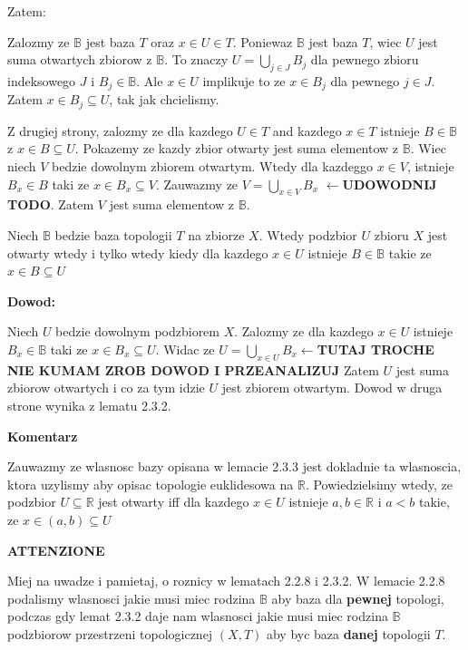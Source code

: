 \documentclass{article}
\begin{document}
Zatem:

Zalozmy ze $\mathbb{B}$ jest baza $T$ oraz $x \in U \in T$. Poniewaz $\mathbb{B}$ jest baza $T$, wiec $U$ jest suma otwartych zbiorow z $\mathbb{B}$. To znaczy $U = \bigcup\limits_{j \in J}B_{j}$ dla pewnego zbioru indeksowego $J$ i $B_{j} \in \mathbb{B}$. Ale $x \in U$ implikuje to ze $x \in B_{j}$ dla pewnego $j \in J$. Zatem $x \in B_{j} \subseteq U$, tak jak chcielismy.

Z drugiej strony, zalozmy ze dla kazdego $U \in T$ and kazdego $x\in T$ istnieje $B \in \mathbb{B}$ z $x \in B \subseteq U$. Pokazemy ze kazdy zbior otwarty jest suma elementow z $\mathbb{B}$. Wiec niech $V$ bedzie dowolnym zbiorem otwartym. Wtedy dla kazdeggo $x \in V$, istnieje $B_{x} \in B$ taki ze $x \in B_{x} \subseteq V$. Zauwazmy ze $V = \bigcup\limits_{x \in V}B_{x}$ $\leftarrow$\textbf{UDOWODNIJ TODO}. Zatem $V$ jest suma elementow z $\mathbb{B}$.

\begin{tcolorbox}[colback=white!90!green,colframe=black!35!green,title=2.3.3 Lemat: Baza topologii podejscie 3?]

    Niech $\mathbb{B}$ bedzie baza topologii $T$ na zbiorze $X$. Wtedy podzbior $U$ zbioru $X$ jest otwarty wtedy i tylko wtedy kiedy dla kazdego $x \in U$ istnieje $B \in \mathbb{B}$ takie ze $x \in B \subseteq U$

\end{tcolorbox}

\textbf{Dowod:}

Niech $U$ bedzie dowolnym podzbiorem $X$. Zalozmy ze dla kazdego $x \in U$ istnieje $B_{x} \in \mathbb{B}$ taki ze $x \in B_{x} \subseteq U$. Widac ze $U = \bigcup\limits_{x \in U}B_{x}\leftarrow$\textbf{TUTAJ TROCHE NIE KUMAM ZROB DOWOD I PRZEANALIZUJ} Zatem $U$ jest suma zbiorow otwartych i co za tym idzie $U$ jest zbiorem otwartym. Dowod w druga strone wynika z lematu 2.3.2.

\textbf{Komentarz}

Zauwazmy ze wlasnosc bazy opisana w lemacie 2.3.3 jest dokladnie ta wlasnoscia, ktora uzylismy aby opisac topologie euklidesowa na $\mathbb{R}$. Powiedzielsimy wtedy, ze podzbior $U \subseteq \mathbb{R}$ jest otwarty iff dla kazdego $x \in U$ istnieje $a,b \in \mathbb{R}$ i $a<b$ takie, ze $x \in (a,b) \subseteq U$

\textbf{ATTENZIONE}

Miej na uwadze i pamietaj, o roznicy w lematach 2.2.8 i 2.3.2. W lemacie 2.2.8 podalismy wlasnosci jakie musi miec rodzina $\mathbb{B}$ aby baza dla \textbf{pewnej} topologi, podczas gdy lemat 2.3.2 daje nam wlasnosci jakie musi miec rodzina $\mathbb{B}$ podzbiorow przestrzeni topologicznej $(X,T)$ aby byc baza \textbf{danej} topologii $T$.
\end{document}
